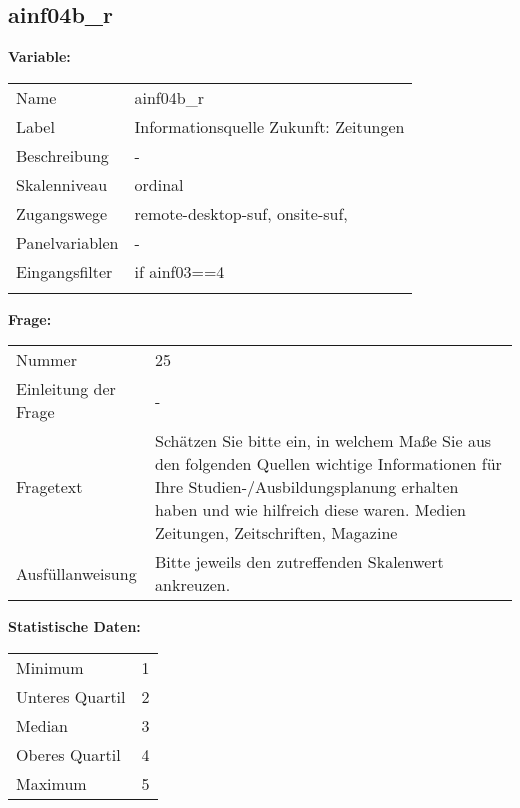 	
	
	\subsection{ainf04b\_r}
	\label{subSection:ainf04b_r}

	\noindent\textbf{Variable:}\\
		\begin{tabular}{lL{11.3cm}}
			\label{tableVariable:ainf04b_r}
			Name & ainf04b\_r \\
			Label & Informationsquelle Zukunft: Zeitungen \\
			Beschreibung & - \\
			Skalenniveau & ordinal \\
			Zugangswege &
				remote-desktop-suf,
				onsite-suf,
 \\
			Panelvariablen & -
			 \\
			Eingangsfilter & if ainf03==4 \\
 \\
		\end{tabular}

		\vspace*{1 cm}
		\noindent\textbf{Frage:}\\
		\begin{tabular}{lL{11.3cm}}
			\label{tableQuestion:ainf04b_r}
			Nummer & 25 \\
			Einleitung der Frage & - \\
			Fragetext & Schätzen Sie bitte ein, in welchem Maße Sie aus den folgenden Quellen wichtige Informationen für Ihre Studien-/Ausbildungsplanung erhalten haben und wie hilfreich diese waren.
Medien
Zeitungen, Zeitschriften, Magazine \\
			Ausfüllanweisung & Bitte jeweils den zutreffenden Skalenwert ankreuzen. \\
		\end{tabular}


		\vspace*{1 cm}
		\noindent\textbf{Statistische Daten:}\\
			\begin{tabular}{ll}
				\label{tableStatistics:ainf04b_r}
					Minimum & 1 \\
					Unteres Quartil & 2 \\
					Median & 3 \\
					Oberes Quartil & 4 \\
					Maximum & 5 \\
			\end{tabular}



